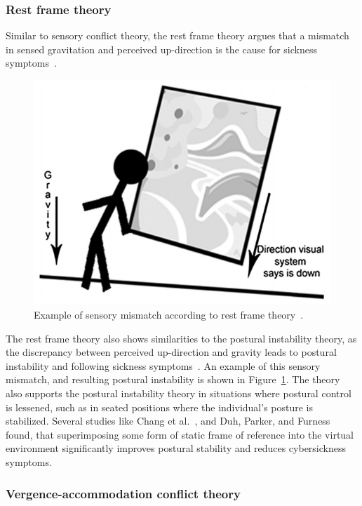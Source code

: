 \subsubsection{Rest frame theory}
Similar to sensory conflict theory, the rest frame theory argues that a mismatch in sensed gravitation and perceived
up-direction is the cause for sickness symptoms~\cite{Rebenitsch2016}.
\begin{figure}[h]
    \centering
    \includegraphics[width=\textwidth/2]{content/2_related_work/img/SensoryMismatchRestFrame[Rebenitsch2016]}
    \caption{Example of sensory mismatch according to rest frame theory~\cite{Rebenitsch2016}.}
    \label{fig:sensory-mismatch-example}
\end{figure}
The rest frame theory also shows similarities to the postural instability theory, as the discrepancy between perceived
up-direction and gravity leads to postural instability and following sickness symptoms~\cite{Rebenitsch2016}.
An example of this sensory mismatch, and resulting postural instability is shown in
Figure~\ref{fig:sensory-mismatch-example}.
The theory also supports the postural instability theory in situations where postural control is lessened, such as in
seated positions where the individual's posture is stabilized.
Several studies like Chang et al.~\cite{Chang2013}, and Duh, Parker, and Furness~\cite{Duh2001b} found, that
superimposing some form of static frame of reference into the virtual environment significantly improves postural
stability and reduces cybersickness symptoms.


\subsubsection{Vergence-accommodation conflict theory}\label{subsubsec:vergence-accommodation-conflict-theory}

